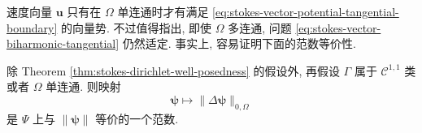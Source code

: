 \setcounter{statement}{6}
\begin{Remark}\label{rem:stokes-vector-potential-multiply-connected}
速度向量 $\mathbf{u}$ 只有在 $\Omega$ 单连通时才有满足
\eqref{eq:stokes-vector-potential-tangential-boundary} 的向量势.
不过值得指出, 即使 $\Omega$ 多连通, 问题
\eqref{eq:stokes-vector-biharmonic-tangential} 仍然适定.
事实上, 容易证明下面的范数等价性.
\end{Remark}

\setcounter{statement}{1}
\begin{Lemma}\label{lem:stokes-vector-biharmonic-norm-tangential}
除 Theorem \ref{thm:stokes-dirichlet-well-posedness} 的假设外,
再假设 $\Gamma$ 属于 $\mathcal{C}^{1,1}$ 类或者 $\Omega$ 单连通.
则映射
\[
\boldsymbol{\psi}\longmapsto
\|\Delta\boldsymbol{\psi}\|_{0,\Omega}
\]
是 $\Psi$ 上与 $\|\boldsymbol{\psi}\|$ 等价的一个范数.
\end{Lemma}
